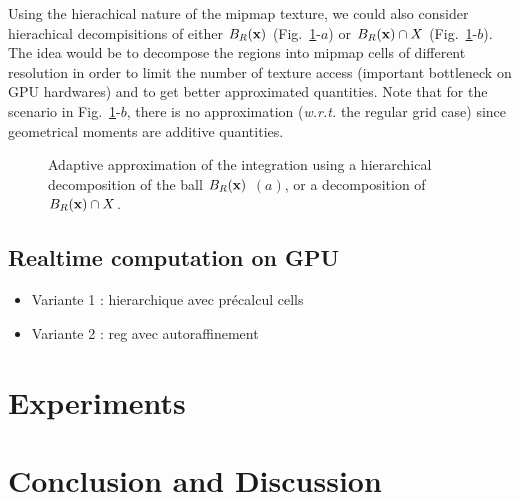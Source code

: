 \documentclass{llncs}
\newcommand{\wrt}{\emph{w.r.t.} }
\begin{document}
Using the hierachical nature of the mipmap texture, we could also
consider hierachical decompisitions of either $B_R(\mathbf{x})$
(Fig.~\ref{fig:approx2}-$a$) or $B_R(\mathbf{x})\cap X$
(Fig.~\ref{fig:approx2}-$b$). The idea would be to decompose the
regions into mipmap cells of different resolution in order to limit
the number of texture access (important bottleneck on GPU hardwares)
and to get better approximated quantities. Note that for the scenario
in Fig.~\ref{fig:approx2}-$b$, there is no approximation (\wrt the
regular grid case) since  geometrical moments are additive quantities.
\begin{figure}
  \begin{center}
  \end{center}
  \caption{Adaptive approximation of the integration using a
    hierarchical decomposition of the ball $B_R(\mathbf{x})$ $(a)$, or a decomposition of $B_R(\mathbf{x})\cap X$.}
  \label{fig:approx2}
\end{figure}


\subsection{Realtime computation on GPU}
\begin{itemize}
\item   Variante 1 : hierarchique avec précalcul cells
\item   Variante 2 : reg avec autoraffinement
\end{itemize}




\section{Experiments}
\label{sec:experiments}



\section{Conclusion and Discussion}
\label{sec:discussion}
\end{document}
